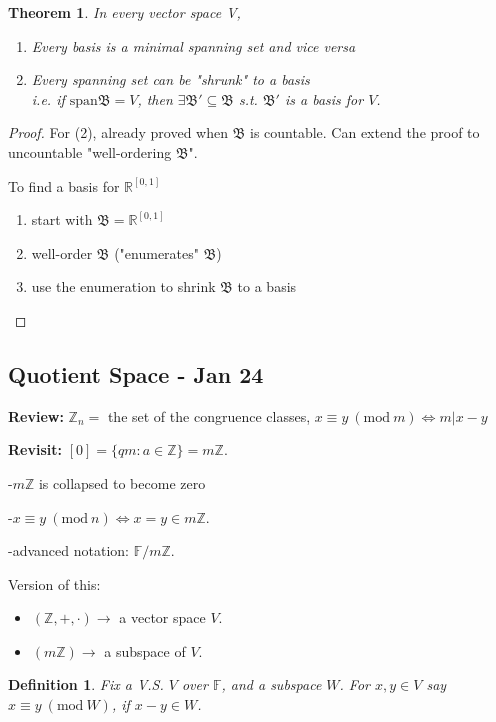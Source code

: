 \documentclass[12pt]{article}
\theoremstyle{plain}
\newtheorem{theorem}{Theorem}[subsection]
\newtheorem{definition}{Definition}[subsection]
\newcommand{\Span}{\mathrm{span}}
\newcommand{\mR}{{\mathbb{R}}}
\newcommand{\mZ}{{\mathbb{Z}}}
\newcommand{\mF}{{\mathbb{F}}}
\newcommand{\Mod}[1]{\ (\mathrm{mod}\ #1)}
\begin{document}
	\begin{theorem}
		In every vector space V, 
		\begin{enumerate}
			\item Every basis is a minimal spanning set and vice versa
			\item Every spanning set can be "shrunk" to a basis\\
				i.e. if $\Span\mathfrak{B} = V$, then $\exists \mathfrak{B}'
				\subseteq \mathfrak{B}$ s.t. $\mathfrak{B}'$ is a basis for 
				$V$. 
		\end{enumerate}
	\end{theorem}
	\begin{proof}
		For (2), already proved when $\mathfrak{B}$ is countable. 
		Can extend the proof to uncountable "well-ordering $\mathfrak{B}$".

		To find a basis for $\mR^{[0,1]}$
		\begin{enumerate}
			\item start with $\mathfrak{B} = \mR^{[0,1]}$
			\item well-order $\mathfrak{B}$ ("enumerates" $\mathfrak{B}$)
			\item use the enumeration to shrink $\mathfrak{B}$ to a basis\\
		\end{enumerate}
	\end{proof}


	\newpage
	\subsection{Quotient Space - Jan 24}
	{\color{OliveGreen}\textbf{Review: } 
	$\mZ_n =$ the set of the congruence classes, 
	$x \equiv y \Mod m \iff m \vert x-y$

	\textbf{Revisit: } $[0] = \{qm : a \in \mZ\} = m\mZ$. 

	-$m\mZ$ is collapsed to become zero

	-$x \equiv y \Mod n \iff x = y \in m\mZ$.

	-advanced notation: $\mF/m\mZ$. 

	Version of this: 
	\begin{itemize}
		\item $(\mZ, +, \cdot) \to$ a vector space $V$.
		\item $(m\mZ) \to$ a subspace of $V$.\\
	\end{itemize}
	}

	\begin{definition}
		Fix a V.S. $V$ over $\mF$, and a subspace $W$. 
		For $x, y \in V$ say $x \equiv y \Mod W$, if $x - y \in W$. \\
	\end{definition}
\end{document}
